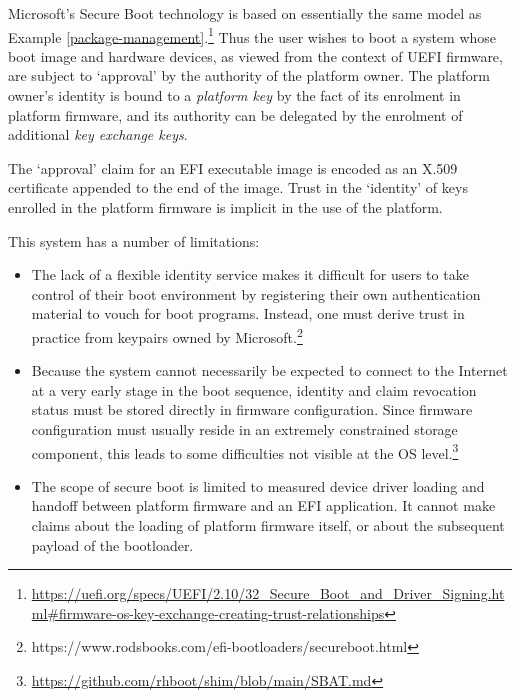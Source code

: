 \begin{example}

  Microsoft's Secure Boot technology is based on essentially the same model as Example \ref{package-management}.\footnote{\url{https://uefi.org/specs/UEFI/2.10/32_Secure_Boot_and_Driver_Signing.html\#firmware-os-key-exchange-creating-trust-relationships}}
  Thus the user wishes to boot a system whose boot image and hardware devices, as viewed from the context of UEFI firmware, are subject to `approval' by the authority of the platform owner.
  The platform owner's identity is bound to a \emph{platform key} by the fact of its enrolment in platform firmware, and its authority can be delegated by the enrolment of additional \emph{key exchange keys}.

  The `approval' claim for an EFI executable image is encoded as an X.509 certificate appended to the end of the image.
  Trust in the `identity' of keys enrolled in the platform firmware is implicit in the use of the platform.

  This system has a number of limitations:
  \begin{itemize}
    \item
      The lack of a flexible identity service makes it difficult for users to take control of their boot environment by registering their own authentication material to vouch for boot programs.
      Instead, one must derive trust in practice from keypairs owned by Microsoft.\footnote{https://www.rodsbooks.com/efi-bootloaders/secureboot.html}

    \item 
      Because the system cannot necessarily be expected to connect to the Internet at a very early stage in the boot sequence, identity and claim revocation status must be stored directly in firmware configuration.
      Since firmware configuration must usually reside in an extremely constrained storage component, this leads to some difficulties not visible at the OS level.\footnote{\url{https://github.com/rhboot/shim/blob/main/SBAT.md}}
    
    \item
      The scope of secure boot is limited to measured device driver loading and handoff between platform firmware and an EFI application.
      It cannot make claims about the loading of platform firmware itself, or about the subsequent payload of the bootloader.
      
  \end{itemize}
\end{example}

